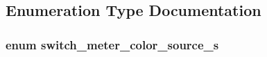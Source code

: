 \subsection{Enumeration Type Documentation}
\hypertarget{group__Meters_ga2eeabdade8a78d5e09693abf1f202539}{
\subsubsection[{switch\+\_\+meter\+\_\+color\+\_\+source\+\_\+s}]{\setlength{\rightskip}{0pt plus 5cm}enum {\bf switch\+\_\+meter\+\_\+color\+\_\+source\+\_\+s}}}\label{group__Meters_ga2eeabdade8a78d5e09693abf1f202539}
